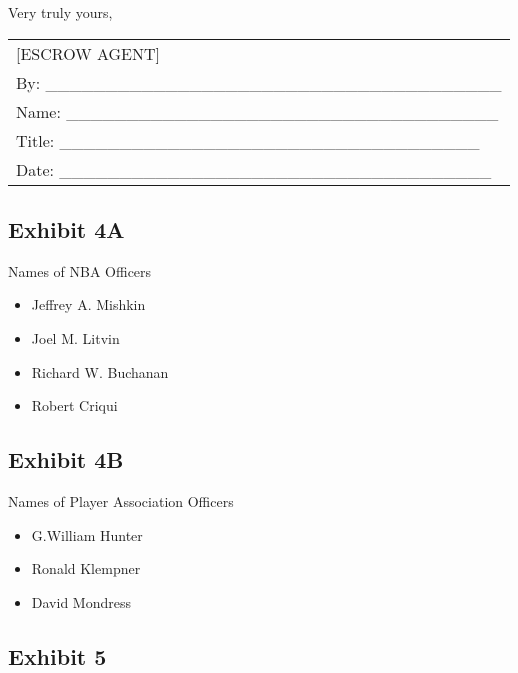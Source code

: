 \documentclass[
]{book}
\providecommand{\tightlist}{%
  \setlength{\itemsep}{0pt}\setlength{\parskip}{0pt}}
\begin{document}
Very truly yours,

\begin{longtable}[]{@{}l@{}}
\toprule()
\endhead
{[}ESCROW AGENT{]} \\
By: \_\_\_\_\_\_\_\_\_\_\_\_\_\_\_\_\_\_\_\_\_\_\_\_\_\_\_\_\_\_\_\_\_\_\_\_\_\_ \\
Name: \_\_\_\_\_\_\_\_\_\_\_\_\_\_\_\_\_\_\_\_\_\_\_\_\_\_\_\_\_\_\_\_\_\_\_\_ \\
Title: \_\_\_\_\_\_\_\_\_\_\_\_\_\_\_\_\_\_\_\_\_\_\_\_\_\_\_\_\_\_\_\_\_\_\_ \\
Date: \_\_\_\_\_\_\_\_\_\_\_\_\_\_\_\_\_\_\_\_\_\_\_\_\_\_\_\_\_\_\_\_\_\_\_\_ \\
\bottomrule()
\end{longtable}

\newpage

\hypertarget{exhibit-4a}{%
\subsection{Exhibit 4A}\label{exhibit-4a}}

Names of NBA Officers

\begin{itemize}
\tightlist
\item
  Jeffrey A. Mishkin
\item
  Joel M. Litvin
\item
  Richard W. Buchanan
\item
  Robert Criqui
\end{itemize}

\newpage

\hypertarget{exhibit-4b}{%
\subsection{Exhibit 4B}\label{exhibit-4b}}

Names of Player Association Officers

\begin{itemize}
\tightlist
\item
  G.William Hunter
\item
  Ronald Klempner
\item
  David Mondress
\end{itemize}

\newpage

\hypertarget{exhibit-5}{%
\subsection{Exhibit 5}\label{exhibit-5}}
\end{document}
